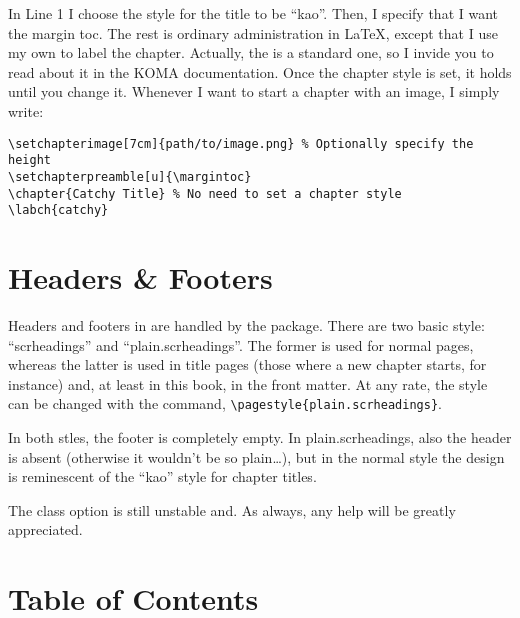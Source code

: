 In Line 1 I choose the style for the title to be \enquote{kao}. Then, I 
specify that I want the margin toc. The rest is ordinary administration 
in \LaTeX, except that I use my own  to label the 
chapter. Actually, the  is a standard 
\KOMAScript\xspace one, so I invide you to read about it in the KOMA 
documentation. Once the chapter style is set, it holds until you change 
it. Whenever I want to start a chapter with an image, 
I simply write:

\begin{lstlisting}
\setchapterimage[7cm]{path/to/image.png} % Optionally specify the height
\setchapterpreamble[u]{\margintoc}
\chapter{Catchy Title} % No need to set a chapter style
\labch{catchy}
\end{lstlisting}

\section{Headers \& Footers}

Headers and footers in \KOMAScript\xspace are handled by the 
 package. There are two basic style: 
\enquote{scrheadings} and \enquote{plain.scrheadings}. The former is 
used for normal pages, whereas the latter is used in title pages (those 
where a new chapter starts, for instance) and, at least in this book, in 
the front matter. At any rate, the style can be changed with the 
 command, \eg 
\lstinline|\pagestyle{plain.scrheadings}|.

In both stles, the footer is completely empty. In plain.scrheadings, 
also the header is absent (otherwise it wouldn't be so plain\ldots), but 
in the normal style the design is reminescent of the \enquote{kao} style 
for chapter titles.

\begin{kaobox}[frametitle=To Do]
The  class option is still unstable and. As always, any 
help will be greatly appreciated.
\end{kaobox}

\section{Table of Contents}

